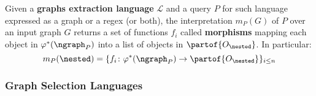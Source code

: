 \begin{definition}\label{sec:graphamatch}
	Given a \textbf{graphs extraction language} $\mathcal{L}$ and a query $P$ for such language expressed as a graph or a regex (or both),
	the interpretation $m_P(G)$ of $P$ over an input graph $G$ returns a set of functions
	$f_i$ called \textbf{morphisms}  mapping each object in $\varphi^*(\ngraph_P)$ into a list of objects in $\partof{O_\nested}$. In particular:
	\[m_P(\nested)=\{f_i\colon\varphi^*(\ngraph_P)\to  \partof{O_\nested}\}_{i\leq n}\]
	
\end{definition}



\subsubsection{Graph Selection Languages}



